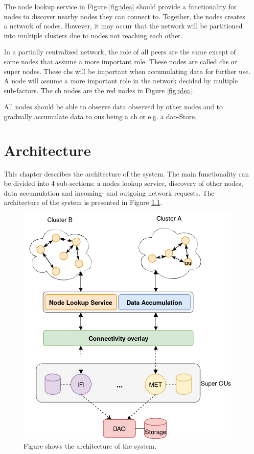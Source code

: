 \documentclass[USenglish]{uit-thesis}
\begin{document}
The node lookup service in Figure \ref{fig:idea} should provide a functionality for nodes to discover nearby nodes they can connect to. Together, the nodes creates a network of nodes. However, it may occur that the network will be partitioned into multiple clusters due to nodes not reaching each other.

In a partially centralized network, the role of all peers are the same except of some nodes that assume a more important role. These nodes are called \gls{ch}s or super nodes. These \gls{ch}s will be important when accumulating data for further use. A node will assume a more important role in the network decided by multiple sub-factors. The \gls{ch} nodes are the red nodes in Figure \ref{fig:idea}.

All nodes should be able to observe data observed by other nodes and to gradually accumulate data to \gls{ou}s being a \gls{ch} or e.g. a \gls{dao}-Store.





\chapter{Architecture}
\glsresetall

This chapter describes the architecture of the system. The main functionality can be divided into 4 sub-sections: a nodes lookup service, discovery of other nodes, data accumulation and incoming- and outgoing network requests. The architecture of the system is presented in Figure \ref{fig:architecture3}.


\begin{figure}
\centering
\includegraphics[width=\textwidth]{arch3.png}
\caption{Figure shows the architecture of the system.}
\label{fig:architecture3}
\end{figure}
\end{document}
